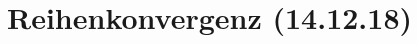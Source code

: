 \documentclass[../ana1u.tex]{subfiles}
\begin{document}
\setcounter{section}{8}

\section{Reihenkonvergenz (14.12.18)}
\end{document}
